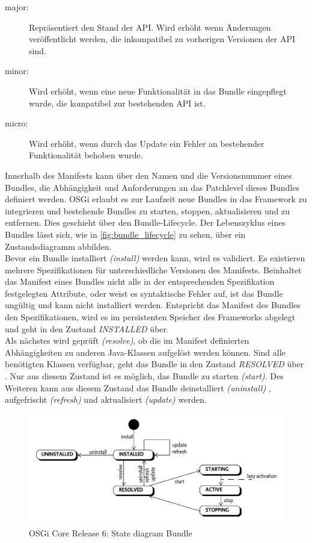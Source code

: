 \begin{description}
 \item [major:] Repräsentiert den Stand der API. Wird erhöht wenn Änderungen veröffentlicht werden, die inkompatibel zu vorherigen Versionen der API sind.
 \item [minor:] Wird erhöht, wenn eine neue Funktionalität in das Bundle eingepflegt wurde, die kompatibel zur bestehenden API ist.
 \item [micro:] Wird erhöht, wenn durch das Update ein Fehler an bestehender Funktionalität behoben wurde.
\end{description}

Innerhalb des Manifests kann über den Namen und die Versionsnummer eines Bundles, die Abhängigkeit und Anforderungen an das Patchlevel dieses Bundles definiert werden.
OSGi erlaubt es zur Laufzeit neue Bundles in das Framework zu integrieren und bestehende Bundles zu starten, stoppen, aktualisieren und zu entfernen.
Dies geschieht über den Bundle-Lifecycle. Der Lebenszyklus eines Bundles lässt sich, wie in \autoref{fig:bundle_lifecycle} zu sehen, über ein Zustandsdiagramm abbilden.\\

Bevor ein Bundle installiert \textit{(install)} werden kann, wird es validiert. Es existieren mehrere Spezifikationen für unterschiedliche Versionen des Manifests. 
Beinhaltet das Manifest eines Bundles nicht alle in der entsprechenden Spezifikation festgelegten Attribute, oder weist es syntaktische Fehler auf, ist das Bundle ungültig
und kann nicht installiert werden.
Entspricht das Manifest des Bundles den Spezifikationen, wird es im persistenten Speicher des Frameworks abgelegt und geht in den Zustand \textit{INSTALLED} über.\\

Als nächstes wird geprüft \textit{(resolve)}, ob die im Manifest definierten Abhängigkeiten zu anderen Java-Klassen aufgelöst werden können.
Sind alle benötigten Klassen verfügbar, geht das Bundle in den Zustand \textit{RESOLVED} über \cite{osgi_service_platform}.
Nur aus diesem Zustand ist es möglich, das Bundle zu starten \textit{(start)}.
Des Weiteren kann aus diesem Zustand das Bundle deinstalliert \textit{(uninstall)} , aufgefrischt \textit{(refresh)} und aktualisiert \textit{(update)} werden.

\begin{figure}[ht]
 \centering
 \includegraphics[scale=0.5]{content/pictures/osgi_bundle_lifecycle.png}
 \caption{\ac{OSGi} Core Release 6: State diagram Bundle \cite[S. 107]{osgi_r6}}
 \label{fig:bundle_lifecycle}
\end{figure}

